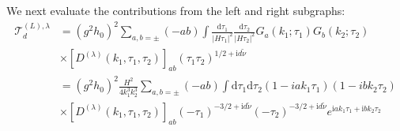 \documentclass[a4paper,12pt]{article}
\def\di{{\mathrm{d}}}
\def\ii{\mathrm{i}}
\def\tn{\tilde\nu}
\begin{document}
We next evaluate the contributions from the left and right subgraphs:
\begin{align}
    \mathcal{T}^{(L),\lambda}_d &= (g^2h_0)^2 \sum_{a,b=\pm} (-ab) \int \frac{\di \tau_1}{|H \tau_1|^2} \frac{\di \tau_2}{|H \tau_2|^2} G_a(k_1;\tau_1) G_b(k_2;\tau_2) \nonumber \\
    &\times \left[D^{(\lambda)}(k_1,\tau_1,\tau_2)\right]_{ab} (\tau_1\tau_2)^{1/2+\ii d\tn} \\
    &= (g^2h_0)^2  
    \frac{H^2}{4k_1^3 k_2^3}
    \sum_{a,b=\pm} (-ab)
    \int \di \tau_1 \di \tau_2 
    (1-iak_1\tau_1)(1-ibk_2\tau_2)
    \nonumber \\
    &\times \left[D^{(\lambda)}(k_1,\tau_1,\tau_2)\right]_{ab} 
    (-\tau_1)^{-3/2+\ii d\tn}
    (-\tau_2)^{-3/2+\ii d\tn} 
    e^{\ii ak_1\tau_1 + \ii bk_2\tau_2}
\end{align}
\end{document}
